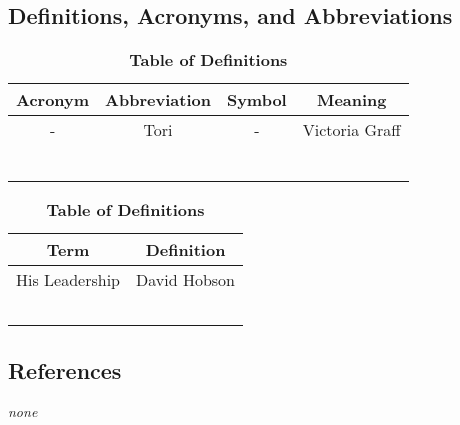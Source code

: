 \documentclass[12pt, titlepage]{article}
\begin{document}
\subsection{Definitions, Acronyms, and Abbreviations}
\label{sub:definitions_acronyms_and_abbreviations}
\begin{table}[h!]
\centering
\caption{\bf Table of Actronyms, Abbreviations, and Symbols}

\begin{tabular}{|c|c|c||c|}
\hline
{\bf Acronym} & {\bf Abbreviation} & {\bf Symbol} & {\bf Meaning}\\
\hline
{-} & {Tori} & {-} & {Victoria Graff}\\
\hline
{} & {} & {} & {}\\
\hline
{} & {} & {} & {}\\
\hline
{} & {} & {} & {}\\
\hline
{} & {} & {} & {}\\
\hline
{} & {} & {} & {}\\
\hline
{} & {} & {} & {}\\
\hline

\end{tabular}

\centering
\caption{\bf Table of Definitions}

\begin{tabular}{|c|c|}
\hline
{\bf Term} & {\bf Definition}\\
\hline
{His Leadership} & {David Hobson}\\
{} & {}\\
\hline
{} & {}\\
{} & {}\\
\hline
{} & {}\\
{} & {}\\
\hline
\end{tabular}

\end{table}
\newpage
\subsection{References}
\label{sub:references}
\emph{none}
\end{document}
